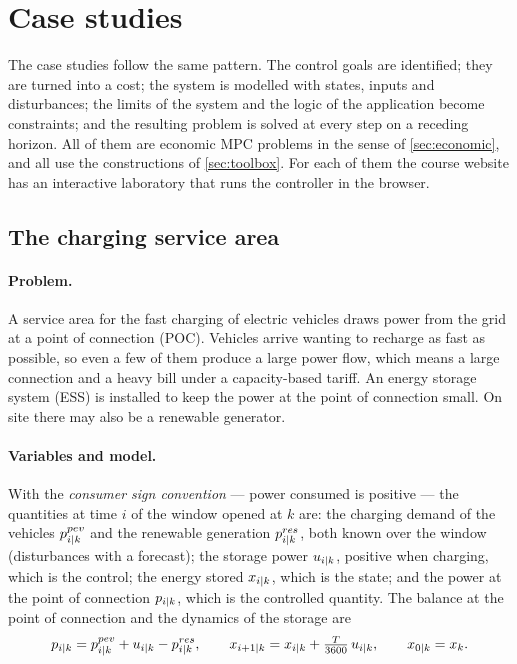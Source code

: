 \section{Case studies}
\label{sec:cases}

The case studies follow the same pattern. The control goals are identified; they are turned
into a cost; the system is modelled with states, inputs and disturbances; the limits of the
system and the logic of the application become constraints; and the resulting problem is solved
at every step on a receding horizon. All of them are economic MPC problems in the sense of
\cref{sec:economic}, and all use the constructions of \cref{sec:toolbox}. For each of them the
course website has an interactive laboratory that runs the controller in the browser.

\subsection{The charging service area}
\label{sec:servicearea}

\paragraph{Problem.} A service area for the fast charging of electric vehicles draws power from
the grid at a point of connection (POC). Vehicles arrive wanting to recharge as fast as
possible, so even a few of them produce a large power flow, which means a large connection and
a heavy bill under a capacity-based tariff. An energy storage system (ESS) is installed to keep
the power at the point of connection small. On site there may also be a renewable generator.

\paragraph{Variables and model.} With the \emph{consumer sign convention} --- power consumed is
positive --- the quantities at time $i$ of the window opened at $k$ are: the charging demand of
the vehicles $p^{pev}_{{i|k}}$ and the renewable generation $p^{res}_{{i|k}}$, both known over
the window (disturbances with a forecast); the storage power $u_{{i|k}}$, positive when
charging, which is the control; the energy stored $x_{{i|k}}$, which is the state; and the power
at the point of connection $p_{{i|k}}$, which is the controlled quantity. The balance at the
point of connection and the dynamics of the storage are
\begin{equation}
  p_{{i|k}} = p^{pev}_{{i|k}} + u_{{i|k}} - p^{res}_{{i|k}}, \qquad
  x_{{i+1|k}} = x_{{i|k}} + \tfrac{T}{3600}\, u_{{i|k}}, \qquad x_{{0|k}} = x_k .
\end{equation}

